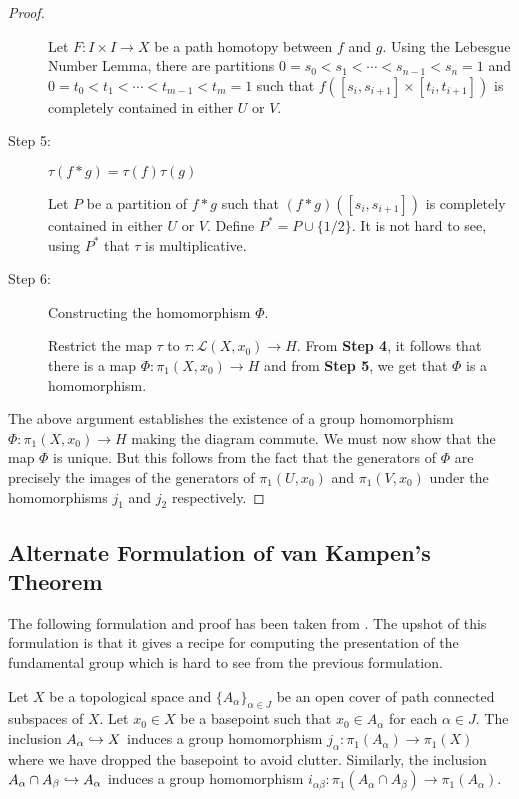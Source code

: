 \begin{proof}
\begin{description}
Let $F: I\times I\to X$ be a path homotopy between $f$ and $g$. Using the Lebesgue Number Lemma, there are partitions $0 = s_0 < s_1 < \cdots < s_{n - 1} < s_n = 1$ and $0 = t_0 < t_1 < \cdots < t_{m - 1} < t_m = 1$ such that $f([s_i,s_{i + 1}]\times[t_i,t_{i + 1}])$ is completely contained in either $U$ or $V$.

\item[Step 5:] $\tau(f * g) = \tau(f)\tau(g)$

Let $P$ be a partition of $f * g$ such that $(f*g)([s_i,s_{i + 1}])$ is completely contained in either $U$ or $V$. Define $P^* = P\cup\{1/2\}$. It is not hard to see, using $P^*$ that $\tau$ is multiplicative.

\item[Step 6:] Constructing the homomorphism $\Phi$.

Restrict the map $\tau$ to $\tau:\mathscr L(X,x_0)\to H$. From \textbf{Step 4}, it follows that there is a map $\Phi:\pi_1(X,x_0)\to H$ and from \textbf{Step 5}, we get that $\Phi$ is a homomorphism.
\end{description}

The above argument establishes the existence of a group homomorphism $\Phi:\pi_1(X,x_0)\to H$ making the diagram commute. We must now show that the map $\Phi$ is unique. But this follows from the fact that the generators of $\Phi$ are precisely the images of the generators of $\pi_1(U,x_0)$ and $\pi_1(V,x_0)$ under the homomorphisms $j_1$ and $j_2$ respectively.
\end{proof}

\subsection{Alternate Formulation of van Kampen's Theorem}

The following formulation and proof has been taken from \cite{hatcheralgtop}. The upshot of this formulation is that it gives a recipe for computing the presentation of the fundamental group which is hard to see from the previous formulation.

Let $X$ be a topological space and $\{A_\alpha\}_{\alpha\in J}$ be an open cover of path connected subspaces of $X$. Let $x_0\in X$ be a basepoint such that $x_0\in A_\alpha$ for each $\alpha\in J$. The inclusion $A_\alpha\hookrightarrow X$ induces a group homomorphism $j_\alpha: \pi_1(A_\alpha)\to\pi_1(X)$ where we have dropped the basepoint to avoid clutter. Similarly, the inclusion $A_\alpha\cap A_\beta\hookrightarrow A_\alpha$ induces a group homomorphism $i_{\alpha\beta}:\pi_1(A_\alpha\cap A_\beta)\to\pi_1(A_\alpha)$.

